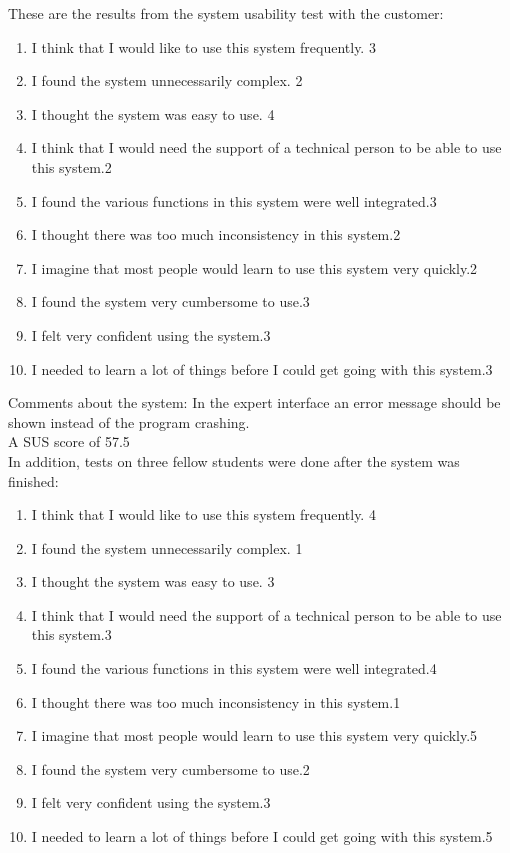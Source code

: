 These are the results from the system usability test with the customer:
\begin{enumerate} \setlength{\itemsep}{0cm}\setlength{\parskip}{0cm}
	\item I think that I would like to use this system frequently. \hfill 3 
	\item I found the system unnecessarily complex. \hfill 2
	\item I thought the system was easy to use. \hfill 4
	\item I think that I would need the support of a technical person to be able to use this system.\hfill 2
	\item I found the various functions in this system were well integrated.\hfill 3
	\item I thought there was too much inconsistency in this system.\hfill 2
	\item I imagine that most people would learn to use this system very quickly.\hfill 2
	\item I found the system very cumbersome to use.\hfill 3
	\item I felt very confident using the system.\hfill 3
	\item I needed to learn a lot of things before I could get going with this system.\hfill 3
\end{enumerate}
Comments about the system: In the expert interface an error message should be shown instead of the program crashing.\\ 
A SUS score of 57.5\\

In addition, tests on three fellow students were done after the system was finished:

\begin{enumerate} \setlength{\itemsep}{0cm}\setlength{\parskip}{0cm}
	\item I think that I would like to use this system frequently. \hfill 4
	\item I found the system unnecessarily complex. \hfill 1
	\item I thought the system was easy to use. \hfill 3
	\item I think that I would need the support of a technical person to be able to use this system.\hfill 3
	\item I found the various functions in this system were well integrated.\hfill 4
	\item I thought there was too much inconsistency in this system.\hfill 1
	\item I imagine that most people would learn to use this system very quickly.\hfill 5
	\item I found the system very cumbersome to use.\hfill 2
	\item I felt very confident using the system.\hfill 3
	\item I needed to learn a lot of things before I could get going with this system.\hfill 5
\end{enumerate}

